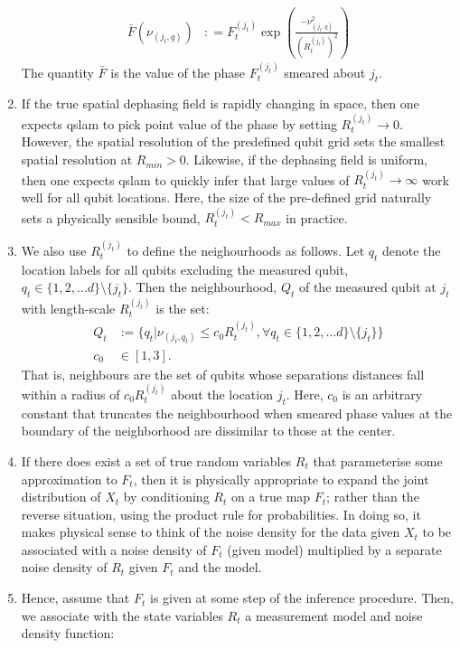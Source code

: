 \begin{enumerate}
	\begin{align}
	\bar{F}(\nu_{(j_t,q)}) &: = F_t^{(j_t)} \exp\left( \frac{- \nu_{(j_t,q)}^2}{(R_t^{(j_t)})^2}\right) \label{main:qslam:defn:bar_F}
	\end{align} The quantity $\bar{F}$ is the value of the phase $F_t^{(j_t)}$ smeared about $j_t$. \item If the true spatial dephasing field is rapidly changing in space, then one expects qslam to pick point value of the phase by setting $R_t^{(j_t)} \to 0$. However, the spatial resolution of the predefined qubit grid sets the smallest spatial resolution at $R_{min} > 0 $. Likewise, if the dephasing field is uniform, then one expects qslam to quickly infer that large values of $R_t^{(j_t)} \to \infty$ work well for all qubit locations. Here, the size of the pre-defined grid naturally sets  a physically sensible bound, $R_t^{(j_t)} < R_{max}$ in practice.  
	\item We also use $R_t^{(j_t)}$ to define the neighourhoods as follows. Let  $q_t$ denote the location labels for all qubits excluding the measured qubit, $ q_t \in \{1, 2, \hdots d \} \setminus \{j_t\} $. Then the neighbourhood, $Q_t$ of the measured qubit at $j_t$ with length-scale $R_t^{(j_t)}$ is the set:
	\begin{align}
	Q_t &:= \{ q_t | \nu_{(j_t, q_t)} \leq c_0 R_t^{(j_t)}, \forall q_t \in \{1, 2, \hdots d \} \setminus \{j_t\} \} \label{main:qslam:defn:Q_t} \\
	 c_0 &\in [1, 3]. 
	\end{align} That is, neighbours are the set of qubits whose separations distances fall within a radius of $c_0 R_t^{(j_t)}$ about the location $j_t$. Here, $c_0$ is an arbitrary constant that truncates the neighbourhood when smeared phase values at the boundary of the neighborhood are dissimilar to those at the center. 
	\item If there does exist a set of  true random variables $R_t$ that parameterise some approximation to $F_t$, then it is physically appropriate to expand the joint distribution of $X_t$ by  conditioning $R_t$ on a true map $F_t$; rather than the reverse situation, using the product rule for probabilities. In doing so, it makes physical sense to think of the noise density for the data given $X_t$ to be associated with a noise density of $F_t$ (given model) multiplied by a separate noise density of $R_t$ given $F_t$ and the model. 
	\item Hence, assume that $F_t$ is given  at some step of the inference procedure. Then, we associate with the state variables $R_t$ a measurement model and noise density function: 

\end{enumerate}
